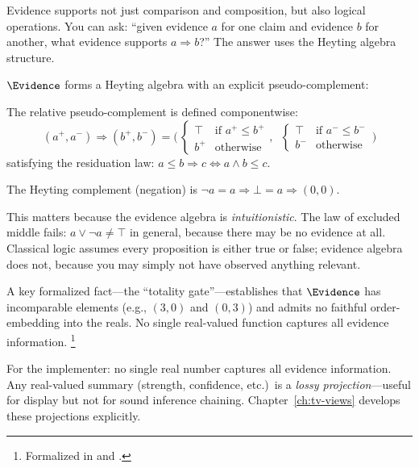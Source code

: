 \documentclass[11pt,openany]{report}
\begin{document}
Evidence supports not just comparison and composition, but also logical
operations.  You can ask: ``given evidence $a$ for one claim and evidence
$b$ for another, what evidence supports $a \Rightarrow b$?''  The answer
uses the Heyting algebra structure.

$\Evidence$ forms a Heyting algebra with an explicit
pseudo-complement:

\begin{definition}
The relative pseudo-complement is defined componentwise:
\[
  (a^+, a^-) \Rightarrow (b^+, b^-) =
  \Big(\,\begin{cases} \top & \text{if } a^+ \le b^+ \\
                        b^+ & \text{otherwise}\end{cases},\;\;
        \begin{cases} \top & \text{if } a^- \le b^- \\
                        b^- & \text{otherwise}\end{cases}\,\Big)
\]
satisfying the residuation law:
$a \le b \Rightarrow c \iff a \wedge b \le c$.
\end{definition}

The Heyting complement (negation) is $\neg a = a \Rightarrow \bot = a \Rightarrow (0,0)$.

This matters because the evidence algebra is \emph{intuitionistic}.
The law of excluded middle fails:
$a \vee \neg a \ne \top$ in general, because there may be no evidence at all.
Classical logic assumes every proposition is either true or false; evidence
algebra does not, because you may simply not have observed anything relevant.

A key formalized fact---the ``totality gate''---establishes that
$\Evidence$ has incomparable elements (e.g., $(3, 0)$ and $(0, 3)$) and
admits no faithful order-embedding into the reals.  No single real-valued
function captures all evidence information.%
\footnote{Formalized in  and
.}

For the implementer: no single real number captures all evidence
information.  Any real-valued summary (strength, confidence, etc.)\ is
a \emph{lossy projection}---useful for display but not for sound
inference chaining.  Chapter~\ref{ch:tv-views} develops these projections
explicitly.
\end{document}
